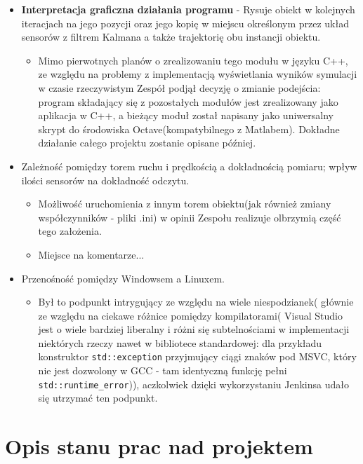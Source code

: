 \documentclass{article}
\begin{document}
\begin{itemize}
		\item \textbf{Interpretacja graficzna działania programu} - Rysuje obiekt w kolejnych iteracjach na jego pozycji oraz jego kopię w miejscu określonym przez układ sensorów z filtrem Kalmana a także trajektorię obu instancji obiektu.
			\begin{itemize}
				\item Mimo pierwotnych planów o zrealizowaniu tego modułu w języku C++, ze względu na problemy z implementacją wyświetlania wyników symulacji w czasie rzeczywistym Zespół podjął decyzję o zmianie podejścia: program składający się z pozostałych modułów jest zrealizowany jako aplikacja w C++, a bieżący moduł został napisany jako uniwersalny skrypt do środowiska Octave(kompatybilnego z Matlabem). Dokładne działanie całego projektu zostanie opisane później.
			\end{itemize}
			
		\item Zależność pomiędzy torem ruchu i prędkością a dokładnością pomiaru; wpływ ilości sensorów na dokładność odczytu. 
			\begin{itemize}
				\item Możliwość uruchomienia z innym torem obiektu(jak również zmiany współczynników - pliki .ini) w opinii Zespołu realizuje olbrzymią część tego założenia.
				\item Miejsce na komentarze... 
			\end{itemize}
		\item Przenośność pomiędzy Windowsem a Linuxem.
			\begin{itemize}
				\item Był to podpunkt intrygujący ze względu na wiele niespodzianek( głównie ze względu na ciekawe różnice pomiędzy kompilatorami( Visual Studio jest o wiele bardziej liberalny i różni się subtelnościami w implementacji niektórych rzeczy nawet w bibliotece standardowej: dla przykładu konstruktor \texttt{std::exception} przyjmujący ciągi znaków pod MSVC, który nie jest dozwolony w GCC - tam identyczną funkcję pełni \texttt{std::runtime\_error})), aczkolwiek dzięki wykorzystaniu Jenkinsa udało się utrzymać ten podpunkt. 
			\end{itemize}
				
		\end{itemize}		
	
	\section{Opis stanu prac nad projektem}
	
\end{document}
